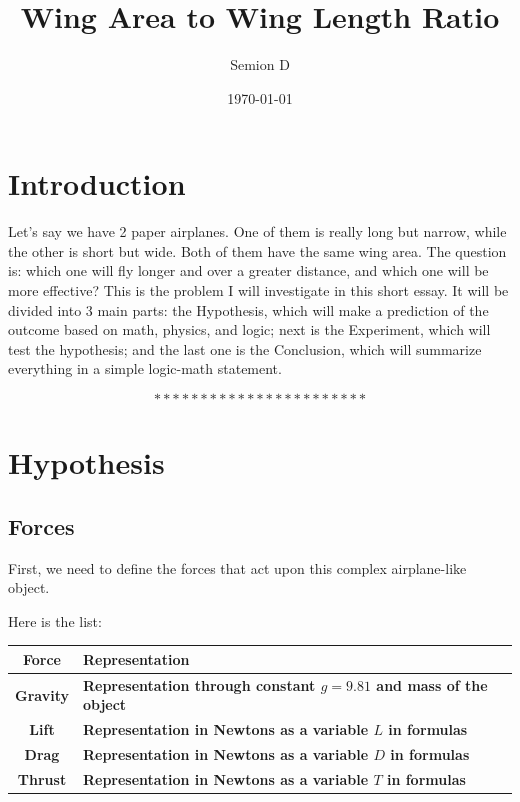 \documentclass[12pt]{article}
\title{Wing Area to Wing Length Ratio}
\author{Semion D}
\date{\today}
\begin{document}
\maketitle

\section{Introduction} 

Let's say we have 2 paper airplanes. One of them is really long but narrow, while the other is short but wide. Both of them have the same wing area. The question is: which one will fly longer and over a greater distance, and which one will be more effective? This is the problem I will investigate in this short essay. It will be divided into 3 main parts: the Hypothesis, which will make a prediction of the outcome based on math, physics, and logic; next is the Experiment, which will test the hypothesis; and the last one is the Conclusion, which will summarize everything in a simple logic-math statement.

\[
***********************
\]

\tableofcontents

\newpage

\section{Hypothesis}

\subsection{Forces}

First, we need to define the forces that act upon this complex airplane-like object.

Here is the list:

\renewcommand{\arraystretch}{2}
\begin{center}
\begin{tabular}{c|l}
\toprule
\textbf{Force} & \textbf{Representation} \\
\midrule
\textbf{Gravity} & \textbf{Representation through constant $g = 9.81$ and mass of the object} \\
\midrule
\textbf{Lift} & \textbf{Representation in Newtons as a variable $L$ in formulas} \\
\midrule
\textbf{Drag} & \textbf{Representation in Newtons as a variable $D$ in formulas} \\
\midrule
\textbf{Thrust} & \textbf{Representation in Newtons as a variable $T$ in formulas} \\
\bottomrule
\end{tabular}
\end{center}
\end{document}
